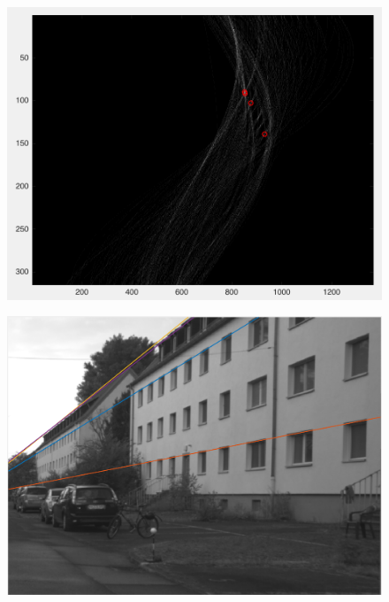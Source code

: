 \documentclass{article}
\begin{document}
\begin{figure}[ht]
\centering
  \includegraphics[scale=0.60]{houghspace.png}
\end{figure}


\begin{figure}[h!]
\centering
  \includegraphics[scale=0.45]{hough.png}
\end{figure}
\end{document}
